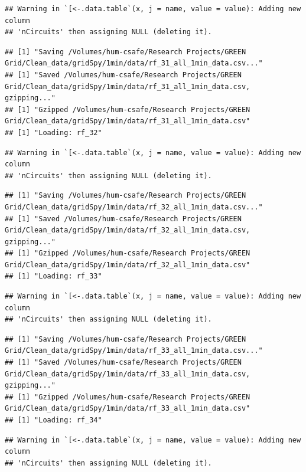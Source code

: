 \documentclass[]{article}
\begin{document}
\begin{verbatim}
## Warning in `[<-.data.table`(x, j = name, value = value): Adding new column
## 'nCircuits' then assigning NULL (deleting it).
\end{verbatim}

\begin{verbatim}
## [1] "Saving /Volumes/hum-csafe/Research Projects/GREEN Grid/Clean_data/gridSpy/1min/data/rf_31_all_1min_data.csv..."
## [1] "Saved /Volumes/hum-csafe/Research Projects/GREEN Grid/Clean_data/gridSpy/1min/data/rf_31_all_1min_data.csv, gzipping..."
## [1] "Gzipped /Volumes/hum-csafe/Research Projects/GREEN Grid/Clean_data/gridSpy/1min/data/rf_31_all_1min_data.csv"
## [1] "Loading: rf_32"
\end{verbatim}

\begin{verbatim}
## Warning in `[<-.data.table`(x, j = name, value = value): Adding new column
## 'nCircuits' then assigning NULL (deleting it).
\end{verbatim}

\begin{verbatim}
## [1] "Saving /Volumes/hum-csafe/Research Projects/GREEN Grid/Clean_data/gridSpy/1min/data/rf_32_all_1min_data.csv..."
## [1] "Saved /Volumes/hum-csafe/Research Projects/GREEN Grid/Clean_data/gridSpy/1min/data/rf_32_all_1min_data.csv, gzipping..."
## [1] "Gzipped /Volumes/hum-csafe/Research Projects/GREEN Grid/Clean_data/gridSpy/1min/data/rf_32_all_1min_data.csv"
## [1] "Loading: rf_33"
\end{verbatim}

\begin{verbatim}
## Warning in `[<-.data.table`(x, j = name, value = value): Adding new column
## 'nCircuits' then assigning NULL (deleting it).
\end{verbatim}

\begin{verbatim}
## [1] "Saving /Volumes/hum-csafe/Research Projects/GREEN Grid/Clean_data/gridSpy/1min/data/rf_33_all_1min_data.csv..."
## [1] "Saved /Volumes/hum-csafe/Research Projects/GREEN Grid/Clean_data/gridSpy/1min/data/rf_33_all_1min_data.csv, gzipping..."
## [1] "Gzipped /Volumes/hum-csafe/Research Projects/GREEN Grid/Clean_data/gridSpy/1min/data/rf_33_all_1min_data.csv"
## [1] "Loading: rf_34"
\end{verbatim}

\begin{verbatim}
## Warning in `[<-.data.table`(x, j = name, value = value): Adding new column
## 'nCircuits' then assigning NULL (deleting it).
\end{verbatim}
\end{document}

